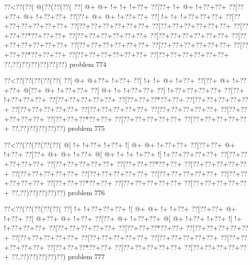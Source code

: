 \vbox{\vbox{\goo
\0??<\0??(\0??(\- @(\0??(\0??(\0??(
\0??[\- @+\- @+\- !+\- !+\- !+\0??+
\0??[\0??+\- !+\- @+\- !+\0??+\0??+
\0??[\0??+\0??+\- @+\- !+\0??+\0??+
\0??[\0??+\- @+\- @+\- !+\0??+\0??+
\0??[\- !+\- !+\- !+\0??+\0??+\0??+
\0??[\0??+\0??+\0??+\0??+\0??+\0??+
\0??[\0??+\0??+\0??+\0??+\0??+\0??+
\0??[\0??+\0??+\0??+\0??+\0??+\0??+
\0??[\0??+\0??+\0??*\0??+\0??+\0??+
\0??[\0??+\0??+\0??+\0??+\0??+\0??+
\0??[\0??+\0??+\0??+\0??+\0??+\0??+
\0??[\0??+\0??+\0??+\0??+\0??+\0??+
\0??[\0??+\0??+\0??+\0??+\0??+\0??+
\0??[\0??+\0??+\0??+\0??+\0??+\0??+
\0??[\0??+\0??+\0??*\0??+\0??+\0??+
\0??[\0??+\0??+\0??+\0??+\0??+\0??+
\0??[\0??+\0??+\0??+\0??+\0??+\0??+
\0??,\0??)\0??)\0??)\0??)\0??)\0??)
}
\hfil problem 774\hfil\break
}

\vbox{\vbox{\goo
\0??<\0??(\0??(\0??(\0??(\0??(
\0??[\- @+\- @+\0??+\- !+\0??+
\0??[\- !+\- !+\- @+\- !+\0??+
\0??[\0??+\- @+\- !+\0??+\0??+
\- @[\0??+\- @+\- !+\0??+\0??+
\0??[\- @+\- !+\- !+\0??+\0??+
\0??[\- !+\0??+\0??+\0??+\0??+
\0??[\0??+\- !+\0??+\0??+\0??+
\0??[\0??+\0??+\0??+\0??+\0??+
\0??[\0??+\0??+\0??*\0??+\0??+
\0??[\0??+\0??+\0??+\0??+\0??+
\0??[\0??+\0??+\0??+\0??+\0??+
\0??[\0??+\0??+\0??+\0??+\0??+
\0??[\0??+\0??+\0??+\0??+\0??+
\0??[\0??+\0??+\0??+\0??+\0??+
\0??[\0??+\0??+\0??*\0??+\0??+
\0??[\0??+\0??+\0??+\0??+\0??+
\0??[\0??+\0??+\0??+\0??+\0??+
\0??,\0??)\0??)\0??)\0??)\0??)
}
\hfil problem 775\hfil\break
}

\vbox{\vbox{\goo
\0??<\0??(\0??(\0??(\0??(\0??(
\- @[\- !+\- !+\0??+\- !+\0??+
\- ![\- @+\- @+\- !+\0??+\0??+
\0??[\0??+\0??+\- @+\- !+\0??+
\0??[\0??+\- @+\- @+\- !+\0??+
\- @[\- @+\- !+\- !+\- !+\0??+
\- ![\- !+\0??+\0??+\0??+\0??+
\0??[\0??+\0??+\0??+\0??+\0??+
\0??[\0??+\0??+\0??+\0??+\0??+
\0??[\0??+\0??+\0??*\0??+\0??+
\0??[\0??+\0??+\0??+\0??+\0??+
\0??[\0??+\0??+\0??+\0??+\0??+
\0??[\0??+\0??+\0??+\0??+\0??+
\0??[\0??+\0??+\0??+\0??+\0??+
\0??[\0??+\0??+\0??+\0??+\0??+
\0??[\0??+\0??+\0??*\0??+\0??+
\0??[\0??+\0??+\0??+\0??+\0??+
\0??[\0??+\0??+\0??+\0??+\0??+
\0??,\0??)\0??)\0??)\0??)\0??)
}
\hfil problem 776\hfil\break
}

\vbox{\vbox{\goo
\0??<\0??(\0??(\0??(\0??(\0??(
\0??[\- !+\- !+\0??+\0??+\0??+
\- ![\- @+\- @+\- !+\- !+\0??+
\0??[\0??+\0??+\- @+\- !+\0??+
\0??[\- @+\0??+\- @+\- !+\0??+
\0??[\0??+\- @+\- !+\0??+\0??+
\- @[\- @+\- !+\0??+\- !+\0??+
\- ![\- !+\- !+\0??+\0??+\0??+
\0??[\0??+\0??+\0??+\0??+\0??+
\0??[\0??+\0??+\0??*\0??+\0??+
\0??[\0??+\0??+\0??+\0??+\0??+
\0??[\0??+\0??+\0??+\0??+\0??+
\0??[\0??+\0??+\0??+\0??+\0??+
\0??[\0??+\0??+\0??+\0??+\0??+
\0??[\0??+\0??+\0??+\0??+\0??+
\0??[\0??+\0??+\0??*\0??+\0??+
\0??[\0??+\0??+\0??+\0??+\0??+
\0??[\0??+\0??+\0??+\0??+\0??+
\0??,\0??)\0??)\0??)\0??)\0??)
}
\hfil problem 777\hfil\break
}

